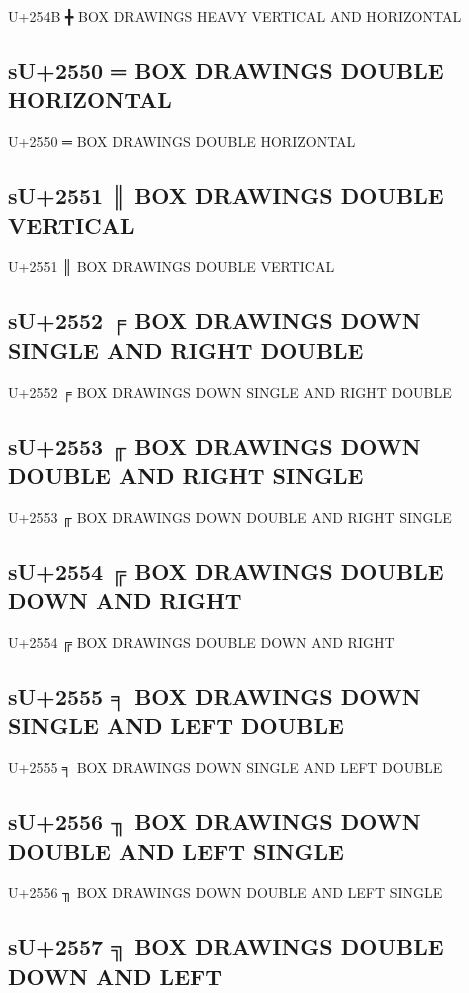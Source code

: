U+254B ╋ BOX DRAWINGS HEAVY VERTICAL AND HORIZONTAL

\subsection{sU+2550 ═ BOX DRAWINGS DOUBLE HORIZONTAL}

U+2550 ═ BOX DRAWINGS DOUBLE HORIZONTAL

\subsection{sU+2551 ║ BOX DRAWINGS DOUBLE VERTICAL}

U+2551 ║ BOX DRAWINGS DOUBLE VERTICAL

\subsection{sU+2552 ╒ BOX DRAWINGS DOWN SINGLE AND RIGHT DOUBLE}

U+2552 ╒ BOX DRAWINGS DOWN SINGLE AND RIGHT DOUBLE

\subsection{sU+2553 ╓ BOX DRAWINGS DOWN DOUBLE AND RIGHT SINGLE}

U+2553 ╓ BOX DRAWINGS DOWN DOUBLE AND RIGHT SINGLE

\subsection{sU+2554 ╔ BOX DRAWINGS DOUBLE DOWN AND RIGHT}

U+2554 ╔ BOX DRAWINGS DOUBLE DOWN AND RIGHT

\subsection{sU+2555 ╕ BOX DRAWINGS DOWN SINGLE AND LEFT DOUBLE}

U+2555 ╕ BOX DRAWINGS DOWN SINGLE AND LEFT DOUBLE

\subsection{sU+2556 ╖ BOX DRAWINGS DOWN DOUBLE AND LEFT SINGLE}

U+2556 ╖ BOX DRAWINGS DOWN DOUBLE AND LEFT SINGLE

\subsection{sU+2557 ╗ BOX DRAWINGS DOUBLE DOWN AND LEFT}

